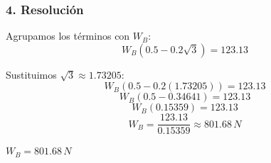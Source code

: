 \documentclass[12pt, a4paper]{article}
\begin{document}
\subsubsection*{4. Resolución}
Agrupamos los términos con $W_B$:
$$W_B (0.5 - 0.2\sqrt{3}) = 123.13$$

Sustituimos $\sqrt{3} \approx 1.73205$:
$$W_B (0.5 - 0.2(1.73205)) = 123.13$$
$$W_B (0.5 - 0.34641) = 123.13$$
$$W_B (0.15359) = 123.13$$
$$W_B = \frac{123.13}{0.15359} \approx 801.68 \, \si{N}$$

\begin{tcolorbox}[colback=green!5!white, colframe=green!50!black, title=Respuesta Final]
\centering \Large $W_B = 801.68 \, \si{N}$
\end{tcolorbox}
\end{document}
